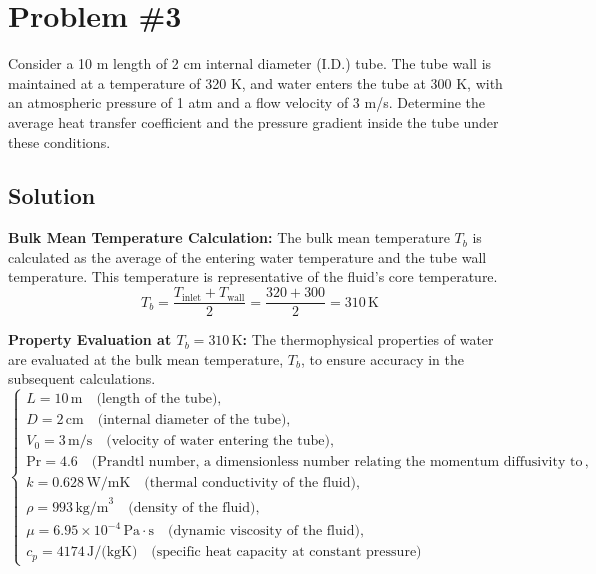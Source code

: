\documentclass{article}
\numberwithin{equation}{section}
\begin{document}
\newpage
\section{Problem \#3}
Consider a 10 m length of 2 cm internal diameter (I.D.) tube. The tube wall is maintained at a temperature of 320 K, and water enters the tube at 300 K, with an atmospheric pressure of 1 atm and a flow velocity of 3 m/s. Determine the average heat transfer coefficient and the pressure gradient inside the tube under these conditions.

\subsection*{Solution}

\textbf{Bulk Mean Temperature Calculation:}
The bulk mean temperature \( T_b \) is calculated as the average of the entering water temperature and the tube wall temperature. This temperature is representative of the fluid's core temperature.
\begin{equation}
T_b = \frac{T_{\text{inlet}} + T_{\text{wall}}}{2} = \frac{320 + 300}{2} = 310\, \text{K}
\end{equation}

\textbf{Property Evaluation at \( T_b = 310\, \text{K} \):}
The thermophysical properties of water are evaluated at the bulk mean temperature, \( T_b \), to ensure accuracy in the subsequent calculations.
\begin{equation}
\left\{
\begin{array}{l}
L = 10\, \text{m} \quad \text{(length of the tube)}, \\
D = 2\, \text{cm} \quad \text{(internal diameter of the tube)}, \\
V_0 = 3\, \text{m/s} \quad \text{(velocity of water entering the tube)}, \\
\text{Pr} = 4.6 \quad \text{(Prandtl number, a dimensionless number relating the momentum diffusivity to thermal diffusivity)}, \\
k = 0.628\, \text{W/mK} \quad \text{(thermal conductivity of the fluid)}, \\
\rho = 993\, \text{kg/m}^3 \quad \text{(density of the fluid)}, \\
\mu = 6.95 \times 10^{-4}\, \text{Pa}\cdot\text{s} \quad \text{(dynamic viscosity of the fluid)}, \\
c_p = 4174\, \text{J/(kgK)} \quad \text{(specific heat capacity at constant pressure)}
\end{array}
\right.
\end{equation}
\end{document}
